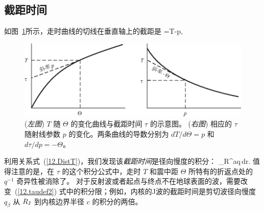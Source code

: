 \subsection{截距时间}
%

如图~\ref{12.fig.taup}所示，走时曲线的切线在垂直轴上的截距是
\eq \label{12.taudef}
\tau=T-p\Theta,
\en
\begin{figure}[!b]
\begin{center}
\includegraphics{../figures/chap12/fig03.eps}
\end{center}
\caption[intercepttime]{\label{12.fig.taup}
({\em 左图\/}) $T$ 随 $\Theta$ 的变化曲线与截距时间 $\tau$ 的示意图。 ({\em 右图\/}) 相应的 $\tau$ 随射线参数 $p$ 的变化。两条曲线的导数分别为
$dT/d\Theta=p$ 和 $d\tau/dp=-\Theta$。}
\end{figure}
利用关系式~(\ref{12.DistT})，我们发现该{\em 截距时间\/}是径向慢度的积分：
%
\eq \label{12.taudef2}
\int_R^aq\,dr.
\en
值得注意的是，在 $\tau$ 的这个积分公式中，走时 $T$ 和震中距 $\Theta$ 所特有的折返点处的 $q^{-1}$ 奇异性被消除了。
对于反射波或者起点与终点不在地球表面的波，需要改变~(\ref{12.taudef2}) 式中的积分限；例如，内核的J波的截距时间是剪切波径向慢度
$q_{\beta}$ 从 $R_{\rm J}$ 到内核边界半径 $c$ 的积分的两倍。

